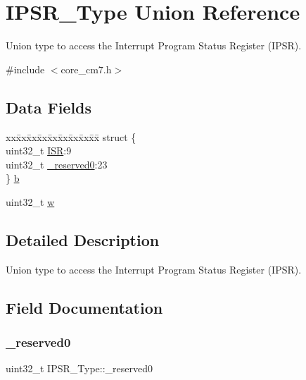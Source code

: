 \hypertarget{unionIPSR__Type}{}\section{I\+P\+S\+R\+\_\+\+Type Union Reference}
\label{unionIPSR__Type}


Union type to access the Interrupt Program Status Register (I\+P\+SR).  




{\ttfamily \#include $<$core\+\_\+cm7.\+h$>$}

\subsection*{Data Fields}
\begin{DoxyCompactItemize}
\item 
\begin{tabbing}
xx\=xx\=xx\=xx\=xx\=xx\=xx\=xx\=xx\=\kill
struct \{\\
\>uint32\_t \mbox{\hyperlink{unionIPSR__Type_ab46e5f1b2f4d17cfb9aca4fffcbb2fa5}{ISR}}:9\\
\>uint32\_t \mbox{\hyperlink{unionIPSR__Type_ad2eb0a06de4f03f58874a727716aa9aa}{\_reserved0}}:23\\
\} \mbox{\hyperlink{unionIPSR__Type_afe1256bc03b84b5c0fdf602f26eb4707}{b}}\\

\end{tabbing}\item 
uint32\+\_\+t \mbox{\hyperlink{unionIPSR__Type_a4adca999d3a0bc1ae682d73ea7cfa879}{w}}
\end{DoxyCompactItemize}


\subsection{Detailed Description}
Union type to access the Interrupt Program Status Register (I\+P\+SR). 

\subsection{Field Documentation}
\mbox{\label{unionIPSR__Type_ad2eb0a06de4f03f58874a727716aa9aa}} 
\subsubsection{\texorpdfstring{\_reserved0}{\_reserved0}}
{\footnotesize\ttfamily uint32\+\_\+t I\+P\+S\+R\+\_\+\+Type\+::\+\_\+reserved0}

